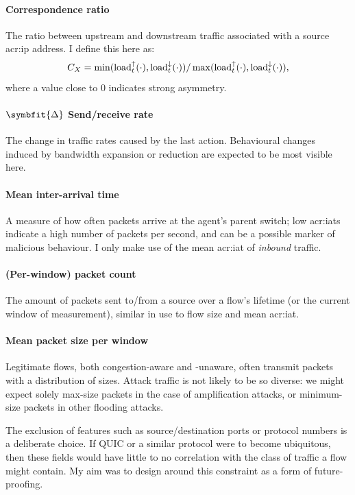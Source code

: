 \paragraph{Correspondence ratio}
The ratio between upstream and downstream traffic associated with a source \gls{acr:ip} address.
I define this here as:
$$C_X = \min(\operatorname{load}^{\uparrow}_{t}(\cdot), \operatorname{load}^{\downarrow}_{t}(\cdot))/\max(\operatorname{load}^{\uparrow}_{t}(\cdot), \operatorname{load}^{\downarrow}_{t}(\cdot)),$$
where a value close to 0 indicates strong asymmetry.

\paragraph{$\symbfit{\Delta}$ Send/receive rate}
The change in traffic rates caused by the last action.
Behavioural changes induced by bandwidth expansion or reduction are expected to be most visible here.

\paragraph{Mean inter-arrival time}
A measure of how often packets arrive at the agent's parent switch; low \glspl{acr:iat} indicate a high number of packets per second, and can be a possible marker of malicious behaviour.
I only make use of the mean \gls{acr:iat} of \emph{inbound} traffic.

\paragraph{(Per-window) packet count}
The amount of packets sent to/from a source over a flow's lifetime (or the current window of measurement), similar in use to flow size and mean \gls{acr:iat}.

\paragraph{Mean packet size per window}
Legitimate flows, both congestion-aware and -unaware, often transmit packets with a distribution of sizes.
Attack traffic is not likely to be so diverse: we might expect solely max-size packets in the case of amplification attacks, or minimum-size packets in other flooding attacks.

The exclusion of features such as source/destination ports or protocol numbers is a deliberate choice.
If QUIC or a similar protocol were to become ubiquitous, then these fields would have little to no correlation with the class of traffic a flow might contain.
My aim was to design around this constraint as a form of future-proofing.

